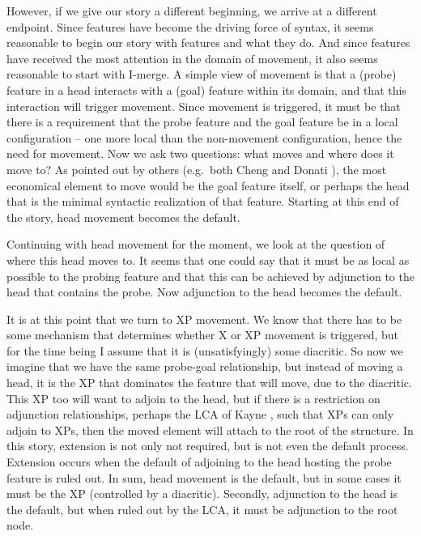\documentclass[output=paper,colorlinks,citecolor=brown,
]{langscibook}
\begin{document}
However, if we give our story a different beginning, we arrive at a different endpoint. Since features have become the driving force of syntax, it seems reasonable to begin our story with features and what they do.  And since  features have received the most attention in the domain of movement, it also seems reasonable to start with I-merge.  A simple view of movement is that a (probe) feature in a head interacts with a (goal) feature within its domain, and that this interaction  will trigger movement.  Since movement is triggered, it must be that there is a requirement that the probe feature and the goal feature be in a local configuration -- one more local than the non-movement configuration, hence the need for movement.  Now we ask two questions: what moves and where does it move to?  As pointed out by others (e.g.\ both Cheng \citeyear{Cheng:2000b} and Donati \citeyear{Donati:2006}), the most economical element to move would be the goal feature itself, or perhaps the head that is the minimal syntactic realization of that feature. Starting at this end of the story, head movement becomes the default.   

Continuing with head movement for the moment, we  look at the question of where this head moves to.  It seems that one could say that it must be as local as possible to the probing feature and that this can be achieved by adjunction to the head that contains the probe.  Now adjunction to the head becomes the default.  

It is at this point that we turn to XP movement.  We know that there has to be some mechanism that determines whether X or XP movement is triggered, but for the time being I assume that it is (unsatisfyingly) some diacritic. So now we imagine that we have the same probe-goal relationship, but instead of moving a head, it is the XP that dominates the feature that will move, due to the diacritic. This XP too will want to adjoin to the head, but if there is a restriction on adjunction relationships, perhaps the LCA of Kayne \citeyearpar{Kayne:1994}, such that XPs can only adjoin to XPs, then the moved element will attach to the root of the structure.  In this story, extension is not only not required, but is not even the default process.  Extension occurs when the default of adjoining to the head hosting the probe feature is ruled out.  In sum, head movement is the default, but in some cases it must be the XP (controlled by a diacritic).  Secondly, adjunction to the head is the default, but when ruled out by the LCA, it must be adjunction to the root node.
\end{document}
